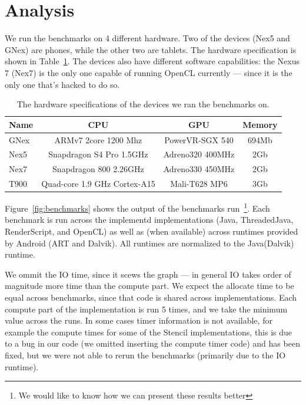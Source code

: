 \section*{Analysis}
\label{sec:analysis}

We run the benchmarks on 4 different hardware.
Two of the devices (Nex5 and GNex) are phones, while the other two are tablets.
The hardware specification is shown in Table~\ref{table:hardware}.
The devices also have different software capabilities: the Nexus 7 (Nex7)
  is the only one capable of running OpenCL currently --- since it is the only
  one that's hacked to do so.

\begin{table}[h]\small
\centering
\begin{tabular}{ | l | c | c | c |}
    \hline 
    Name & CPU & GPU & Memory \\ \hline
    GNex & ARMv7 2core 1200 Mhz & PowerVR-SGX 540 & 694Mb \\ \hline
    Nex5 & Snapdragon S4 Pro 1.5GHz & Adreno320 400MHz & 2Gb} \\ \hline
    Nex7 & Snapdragon 800 2.26GHz & Adreno330 450MHz & 2Gb} \\ \hline
    T900 & Quad-core 1.9 GHz Cortex-A15 & Mali-T628 MP6 & 3Gb} \\ \hline
    \hline
\end{tabular}
\caption{The hardware specifications of the devices we ran the benchmarks on.}
\label{table:hardware}
\end{table}

Figure~\ref{fig:benchmarks} shows the output of the benchmarks run~\footnote{We would like to know how we can present these results better}.
Each benchmark is run across the implementd implementations (Java, ThreadedJava, RenderScript, and OpenCL) as well as (when available) across runtimes provided by Android (ART and Dalvik).
All runtimes are normalized to the Java(Dalvik) runtime.

We ommit the IO time, since it scews the graph --- in general IO takes 
  order of magnitude more time than the compute part.
We expect the allocate time to be equal across benchmarks, since
  that code is shared across implementations.
Each compute part of the implementation is run 5 times, and we 
  take the minimum value across the runs.
In some cases timer information is not available, for example the compute times for some of the Stencil implementations, this is due to a bug in our code (we omitted inserting the compute timer code) and has been fixed, but we were not able to rerun the benchmarks (primarily due to the IO runtime).

